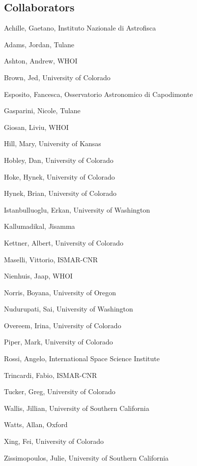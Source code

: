 \documentclass[letterpaper]{resume}
\begin{document}
\subsection{Collaborators}
\begin{multicols}{2}
\begin{compactitem}[\itembullet]

  \item Achille, Gaetano, Instituto Nazionale di Astrofisca
  \item Adams, Jordan, Tulane
  \item Ashton, Andrew,  WHOI
  \item Brown, Jed, University of Colorado
  \item Esposito, Fancesca, Osservatorio Astronomico di Capodimonte
  \item Gasparini, Nicole, Tulane
  \item Giosan, Liviu, WHOI
  \item Hill, Mary, University of Kansas
  \item Hobley, Dan, University of Colorado
  \item Hoke, Hynek, University of Colorado
  \item Hynek, Brian, University of Colorado
  \item Istanbulluoglu, Erkan, University of Washington
  \item Kallumadikal, Jisamma
  \item Kettner, Albert, University of Colorado
  \item Maselli, Vittorio, ISMAR-CNR
  \item Nienhuis, Jaap, WHOI
  \item Norris, Boyana, University of Oregon
  \item Nudurupati, Sai, University of Washington
  \item Overeem, Irina, University of Colorado
  \item Piper, Mark, University of Colorado
  \item Rossi, Angelo, International Space Science Institute
  \item Trincardi, Fabio, ISMAR-CNR
  \item Tucker, Greg, University of Colorado
  \item Wallis, Jillian, University of Southern California
  \item Watts, Allan, Oxford
  \item Xing, Fei, University of Colorado
  \item Zissimopoulos, Julie, University of Southern California
\end{compactitem}
\end{multicols}
\end{document}
